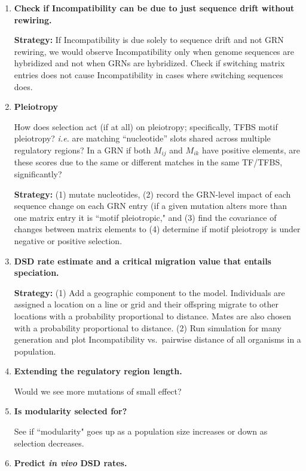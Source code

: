 \documentclass[a4paper, 11 pt]{article}
\begin{document}
\begin{enumerate}
  \item \textbf{Check if Incompatibility can be due to just sequence drift without rewiring.}

    \textbf{Strategy:} If Incompatibility is due solely to sequence drift and not GRN rewiring, we would observe Incompatibility only when genome sequences are hybridized and not when GRNs are hybridized. Check if switching matrix entries does not cause Incompatibility in cases where switching sequences does.

  \item \textbf{Pleiotropy}

    How does selection act (if at all) on pleiotropy; specifically, TFBS motif pleiotropy? \emph{i.e.} are matching ``nucleotide'' slots shared across multiple regulatory regions? In a GRN if both $M_{ij}$ and $M_{ik}$ have positive elements, are these scores due to the same or different matches in the same TF/TFBS, significantly?  

    \textbf{Strategy:} (1) mutate nucleotides, (2) record the GRN-level impact of each sequence change on each GRN entry (if a given mutation alters more than one matrix entry it is ``motif pleiotropic," and (3) find the covariance of changes between matrix elements to (4) determine if motif pleiotropy is under negative or positive selection.

  \item \textbf{DSD rate estimate and a critical migration value that entails speciation.}

    \textbf{Strategy:} (1) Add a geographic component to the model. Individuals are assigned a location on a line or grid and their offspring migrate to other locations with a probability proportional to distance. Mates are also chosen with a probability proportional to distance. (2) Run simulation for many generation and plot Incompatibility vs.\ pairwise distance of all organisms in a population.

  \item \textbf{Extending the regulatory region length.}
    
    Would we see more mutations of small effect?

  \item \textbf{Is modularity selected for?} 

    See if ``modularity" goes up as a population size increases or down as selection decreases. 

  \item \textbf{Predict \emph{in vivo} DSD rates.}
\end{enumerate}
\end{document}
